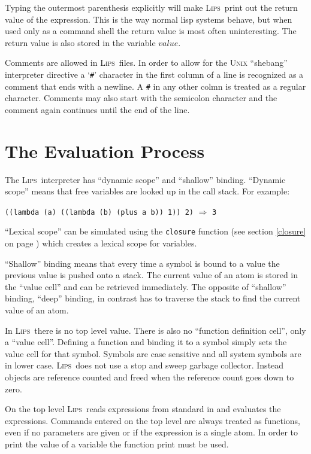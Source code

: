 \documentclass[a4paper]{article}
\newcommand{\lips}{\textsc{Lips}}
\newcommand{\lisp}[1]{\texttt{#1}}
\newcommand{\example}[2]{
  \begin{adjustwidth}{0.2cm}{}
    \lisp{#1} $\Rightarrow$ \lisp{#2}
  \end{adjustwidth}
}
\begin{document}
Typing the outermost parenthesis explicitly will make \lips\ print out
the return value of the expression.  This is the way normal lisp
systems behave, but when used only as a command shell the return value
is most often uninteresting.  The return value is also stored in the
variable $value$.

Comments are allowed in \lips\ files.  In order to allow for the
\textsc{Unix} ``shebang'' interpreter directive a `\lisp{\#}'
character in the first column of a line is recognized as a comment
that ends with a newline. A \lisp{\#} in any other colmn is treated as
a regular character.  Comments may also start with the semicolon
character and the comment again continues until the end of the line.

\section{The Evaluation Process}
The \lips\ interpreter has ``dynamic scope'' and ``shallow'' binding.
``Dynamic scope'' means that free variables are looked up in the call
stack. For example:

\example{((lambda (a) ((lambda (b) (plus a b)) 1)) 2)}{3}

``Lexical scope'' can be simulated using the \lisp{closure} function
(see section \ref{closure} on page \pageref{closure}) which creates a
lexical scope for variables.

``Shallow'' binding means that every time a symbol is bound to a value
the previous value is pushed onto a stack.  The current value of an
atom is stored in the ``value cell'' and can be retrieved immediately.
The opposite of ``shallow'' binding, ``deep'' binding, in contrast has
to traverse the stack to find the current value of an atom.

In \lips\ there is no top level value.  There is also no ``function
definition cell'', only a ``value cell''.  Defining a function and
binding it to a symbol simply sets the value cell for that symbol.
Symbols are case sensitive and all system symbols are in lower case.
\lips\ does not use a stop and sweep garbage collector.  Instead
objects are reference counted and freed when the reference count goes
down to zero.

On the top level \lips\ reads expressions from standard in and
evaluates the expressions.  Commands entered on the top level are
always treated as functions, even if no parameters are given or if the
expression is a single atom.  In order to print the value of a
variable the function print must be used.
\end{document}
